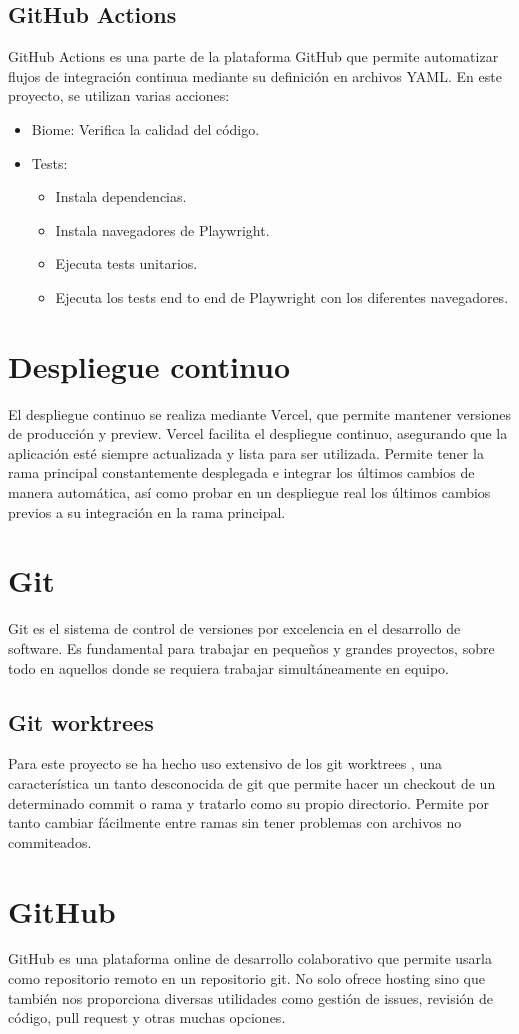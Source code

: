 \subsection{GitHub Actions}
GitHub Actions \cite{github-actions} es una parte de la plataforma GitHub que permite automatizar flujos de integración continua mediante su definición en archivos YAML. En este proyecto, se utilizan varias acciones:
\begin{itemize}
\tightlist
    \item Biome: Verifica la calidad del código.
    \item Tests: 
    \begin{itemize}
        \tightlist
        \item Instala dependencias.
        \item Instala navegadores de Playwright.
        \item Ejecuta tests unitarios.
        \item Ejecuta los tests end to end de Playwright con los diferentes navegadores.
    \end{itemize}
\end{itemize}

\section{Despliegue continuo}
El despliegue continuo se realiza mediante Vercel, que permite mantener versiones de producción y preview. Vercel facilita el despliegue continuo, asegurando que la aplicación esté siempre actualizada y lista para ser utilizada.
Permite tener la rama principal constantemente desplegada e integrar los últimos cambios de manera automática, así como probar en un despliegue real los últimos cambios previos a su integración en la rama principal.

\section{Git}
Git \cite{git} es el sistema de control de versiones por excelencia en el desarrollo de software. Es fundamental para trabajar en pequeños y grandes proyectos, sobre todo en aquellos donde se requiera trabajar simultáneamente en equipo.
\subsection{Git worktrees}
Para este proyecto se ha hecho uso extensivo de los git worktrees \cite{git-worktree}, una característica un tanto desconocida de git que permite hacer un checkout de un determinado commit o rama y tratarlo como su propio directorio.
Permite por tanto cambiar fácilmente entre ramas sin tener problemas con archivos no commiteados.

\section{GitHub}
GitHub es una plataforma online \cite{github} de desarrollo colaborativo que permite usarla como repositorio remoto en un repositorio git.
No solo ofrece hosting sino que también nos proporciona diversas utilidades como gestión de issues, revisión de código, pull request y otras muchas opciones.
